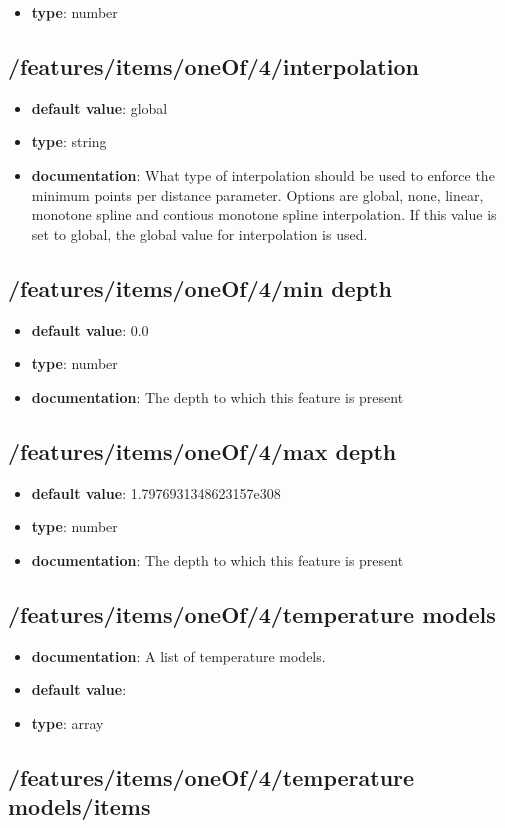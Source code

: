 \begin{itemize}\item {\bf type}: number
\end{itemize}\subsection{/features/items/oneOf/4/interpolation}
\begin{itemize}\item {\bf default value}: global
\item {\bf type}: string
\item {\bf documentation}: What type of interpolation should be used to enforce the minimum points per distance parameter. Options are global, none, linear, monotone spline and contious monotone spline interpolation. If this value is set to global, the global value for interpolation is used.
\end{itemize}\subsection{/features/items/oneOf/4/min depth}
\begin{itemize}\item {\bf default value}: 0.0
\item {\bf type}: number
\item {\bf documentation}: The depth to which this feature is present
\end{itemize}\subsection{/features/items/oneOf/4/max depth}
\begin{itemize}\item {\bf default value}: 1.7976931348623157e308
\item {\bf type}: number
\item {\bf documentation}: The depth to which this feature is present
\end{itemize}\subsection{/features/items/oneOf/4/temperature models}
\begin{itemize}\item {\bf documentation}: A list of temperature models.
\item {\bf default value}: 
\item {\bf type}: array
\end{itemize}\subsection{/features/items/oneOf/4/temperature models/items}

